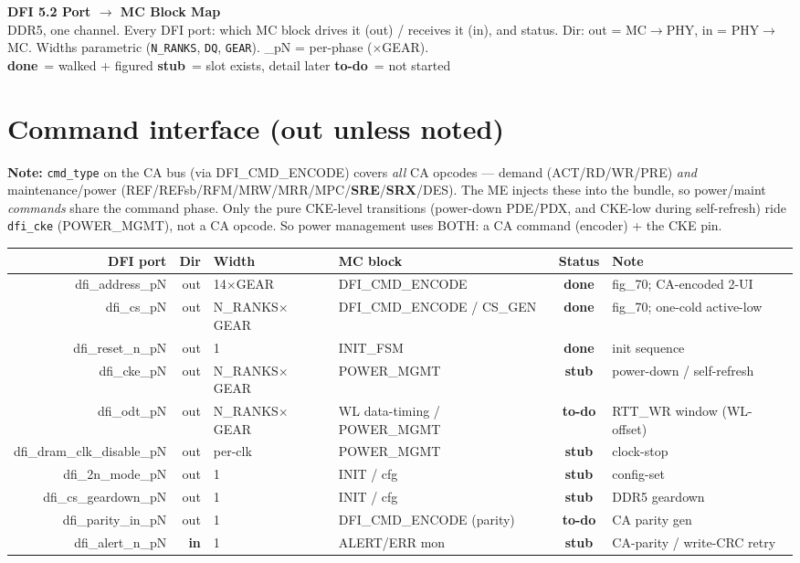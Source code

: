 \documentclass[9pt]{extarticle}
\newcommand{\done}{\textbf{\textcolor{gdone}{done}}}
\newcommand{\stub}{\textbf{\textcolor{gstub}{stub}}}
\newcommand{\todo}{\textbf{\textcolor{gtodo}{to-do}}}
\newenvironment{portmap}{%
  \footnotesize\begin{longtable}{N D W B S X}\toprule
  \textbf{DFI port} & \textbf{Dir} & \textbf{Width} & \textbf{MC block} & \textbf{Status} & \textbf{Note}\\ \midrule\endhead}
  {\bottomrule\end{longtable}}
\begin{document}
\begin{center}
{\LARGE\textbf{DFI 5.2 Port $\rightarrow$ MC Block Map}}\\[2pt]
{\small DDR5, one channel. Every DFI port: which MC block drives it (out) / receives it (in),
and status. Dir: out = MC$\rightarrow$PHY, in = PHY$\rightarrow$MC. Widths parametric
(\texttt{N\_RANKS}, \texttt{DQ}, \texttt{GEAR}). \_pN = per-phase ($\times$GEAR).}\\[2pt]
{\small \done\ = walked + figured \quad \stub\ = slot exists, detail later \quad \todo\ = not started}
\end{center}

\section{Command interface (out unless noted)}
{\footnotesize \textbf{Note:} \texttt{cmd\_type} on the CA bus (via DFI\_CMD\_ENCODE) covers
\emph{all} CA opcodes --- demand (ACT/RD/WR/PRE) \emph{and} maintenance/power
(REF/REFsb/RFM/MRW/MRR/MPC/\textbf{SRE}/\textbf{SRX}/DES). The ME injects these into the bundle, so
power/maint \emph{commands} share the command phase. Only the pure CKE-level transitions
(power-down PDE/PDX, and CKE-low during self-refresh) ride \texttt{dfi\_cke} (POWER\_MGMT), not a CA
opcode. So power management uses BOTH: a CA command (encoder) + the CKE pin.}\\[3pt]
\begin{portmap}
dfi\_address\_pN & out & 14$\times$GEAR & DFI\_CMD\_ENCODE & \done & fig\_70; CA-encoded 2-UI\\
dfi\_cs\_pN & out & N\_RANKS$\times$GEAR & DFI\_CMD\_ENCODE / CS\_GEN & \done & fig\_70; one-cold active-low\\
dfi\_reset\_n\_pN & out & 1 & INIT\_FSM & \done & init sequence\\
dfi\_cke\_pN & out & N\_RANKS$\times$GEAR & POWER\_MGMT & \stub & power-down / self-refresh\\
dfi\_odt\_pN & out & N\_RANKS$\times$GEAR & WL data-timing / POWER\_MGMT & \todo & RTT\_WR window (WL-offset)\\
dfi\_dram\_clk\_disable\_pN & out & per-clk & POWER\_MGMT & \stub & clock-stop\\
dfi\_2n\_mode\_pN & out & 1 & INIT / cfg & \stub & config-set\\
dfi\_cs\_geardown\_pN & out & 1 & INIT / cfg & \stub & DDR5 geardown\\
dfi\_parity\_in\_pN & out & 1 & DFI\_CMD\_ENCODE (parity) & \todo & CA parity gen\\
dfi\_alert\_n\_pN & \textbf{in} & 1 & ALERT/ERR mon & \stub & CA-parity / write-CRC retry\\
\end{portmap}
\end{document}
